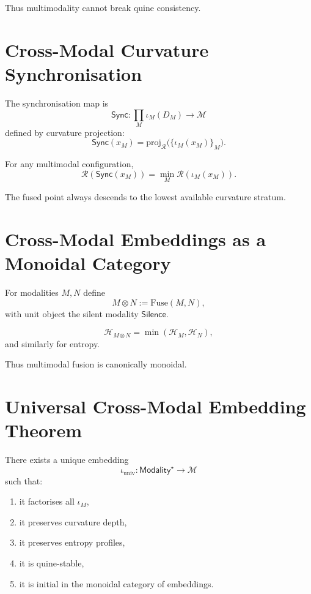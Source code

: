 Thus multimodality cannot break quine consistency.

\section{Cross-Modal Curvature Synchronisation}
\label{sec:59:synch}

\begin{definition}
The synchronisation map is
\[
\mathsf{Sync} :
 \prod_{M} \iota_M(D_M) \to \mathcal{M}
\]
defined by curvature projection:
\[
\mathsf{Sync}(x_M) = 
\mathrm{proj}_{\mathcal{R}}
   \bigl(\{\iota_M(x_M)\}_{M}\bigr).
\]
\end{definition}

\begin{theorem}
For any multimodal configuration,
\[
\mathcal{R}(\mathsf{Sync}(x_M))
=
\min_M \mathcal{R}(\iota_M(x_M)).
\]
\end{theorem}

The fused point always descends to the lowest available curvature stratum.

\section{Cross-Modal Embeddings as a Monoidal Category}
\label{sec:59:monoidal}

\begin{definition}
For modalities $M,N$ define
\[
M \otimes N := \mathrm{Fuse}(M,N),
\]
with unit object the silent modality $\mathsf{Silence}$.
\end{definition}

\begin{theorem}
\[
\mathcal{H}_{M\otimes N}
= \min(\mathcal{H}_M,\mathcal{H}_N),
\]
and similarly for entropy.
\end{theorem}

Thus multimodal fusion is canonically monoidal.

\section{Universal Cross-Modal Embedding Theorem}
\label{sec:59:universal}

\begin{theorem}
There exists a unique embedding
\[
\iota_{\mathrm{univ}} : \mathsf{Modality}^\star \to \mathcal{M}
\]
such that:
\begin{enumerate}
  \item it factorises all $\iota_M$,
  \item it preserves curvature depth,
  \item it preserves entropy profiles,
  \item it is quine-stable,
  \item it is initial in the monoidal category of embeddings.
\end{enumerate}
\end{theorem}

